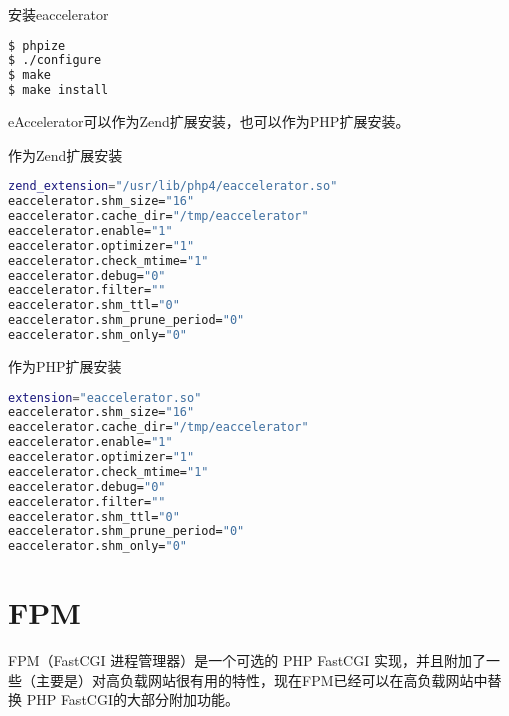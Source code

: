 安装eaccelerator

\begin{lstlisting}[language=bash]
$ phpize
$ ./configure 
$ make
$ make install
\end{lstlisting}

eAccelerator可以作为Zend扩展安装，也可以作为PHP扩展安装。

\begin{compactitem}
\item 作为Zend扩展安装

\begin{lstlisting}[language=bash]
zend_extension="/usr/lib/php4/eaccelerator.so"
eaccelerator.shm_size="16"
eaccelerator.cache_dir="/tmp/eaccelerator"
eaccelerator.enable="1"
eaccelerator.optimizer="1"
eaccelerator.check_mtime="1"
eaccelerator.debug="0"
eaccelerator.filter=""
eaccelerator.shm_ttl="0"
eaccelerator.shm_prune_period="0"
eaccelerator.shm_only="0"
\end{lstlisting}

\item 作为PHP扩展安装

\begin{lstlisting}[language=bash]
extension="eaccelerator.so"
eaccelerator.shm_size="16"
eaccelerator.cache_dir="/tmp/eaccelerator"
eaccelerator.enable="1"
eaccelerator.optimizer="1"
eaccelerator.check_mtime="1"
eaccelerator.debug="0"
eaccelerator.filter=""
eaccelerator.shm_ttl="0"
eaccelerator.shm_prune_period="0"
eaccelerator.shm_only="0"
\end{lstlisting}

\end{compactitem}



\section{FPM}

FPM（FastCGI 进程管理器）是一个可选的 PHP FastCGI 实现，并且附加了一些（主要是）对高负载网站很有用的特性，现在FPM已经可以在高负载网站中替换 PHP FastCGI的大部分附加功能。

